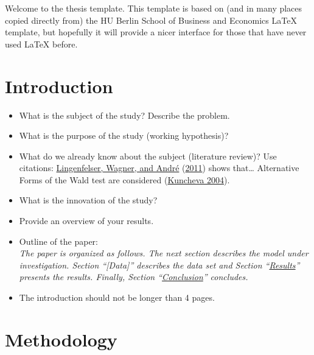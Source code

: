 \documentclass[a4paper,11pt]{article}
\begin{document}
Welcome to the thesis template. This template is based on (and in many places
copied directly from) the HU Berlin School of Business and Economics LaTeX
template, but hopefully it will provide a nicer interface for those that have
never used LaTeX before.

\hypertarget{introduction}{%
\section{Introduction}\label{introduction}}
\begin{itemize}
\item
  What is the subject of the study? Describe the problem.
\item
  What is the purpose of the study (working hypothesis)?
\item
  What do we already know about the subject (literature review)? Use citations:
  \protect\hyperlink{ref-lingenfelser2011systematic}{Lingenfelser, Wagner, and André} (\protect\hyperlink{ref-lingenfelser2011systematic}{2011}) shows that\ldots{} Alternative Forms of the Wald test are
  considered (\protect\hyperlink{ref-kuncheva2004combining}{Kuncheva 2004}).
\item
  What is the innovation of the study?
\item
  Provide an overview of your results.
\item
  Outline of the paper:\\
  \emph{The paper is organized as follows. The next section describes the model
  under investigation. Section ``{[}Data{]}'' describes the data set
  and Section ``\protect\hyperlink{results}{Results}'' presents the results. Finally, Section
  ``\protect\hyperlink{conclusion}{Conclusion}'' concludes.}
\item
  The introduction should not be longer than 4 pages.
\end{itemize}
\hypertarget{methodology}{%
\section{Methodology}\label{methodology}}
\end{document}
